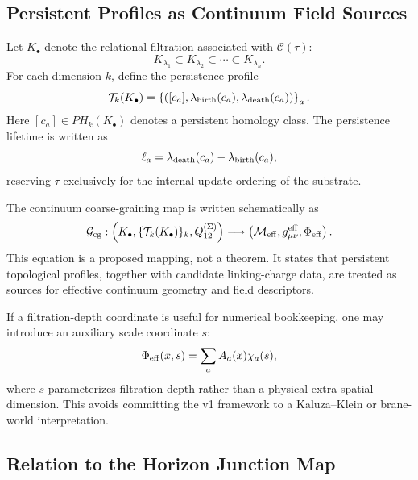 \documentclass[11pt]{article}
\newcommand{\Ccal}{\mathcal{C}}
\newcommand{\Gcg}{\mathcal{G}_{\rm cg}}
\newcommand{\Qlink}{Q_{12}^{(\Sigma)}}
\begin{document}
\subsection{Persistent Profiles as Continuum Field Sources}

Let \(K_\bullet\) denote the relational filtration associated with \(\Ccal(\tau)\):
\begin{equation}
    K_{\lambda_1}\subset K_{\lambda_2}\subset\cdots\subset K_{\lambda_n}.
\end{equation}
For each dimension \(k\), define the persistence profile
\begin{equation}
    \mathcal T_k(K_\bullet)
    =
    \left\{
    \left([c_a],\lambda_{\rm birth}(c_a),\lambda_{\rm death}(c_a)\right)
    \right\}_{a}.
\end{equation}
Here \([c_a]\in PH_k(K_\bullet)\) denotes a persistent homology class. The persistence lifetime is written as
\begin{equation}
    \ell_a=\lambda_{\rm death}(c_a)-\lambda_{\rm birth}(c_a),
\end{equation}
reserving \(\tau\) exclusively for the internal update ordering of the substrate.

The continuum coarse-graining map is written schematically as
\begin{equation}
    \Gcg:
    \left(K_\bullet,\{\mathcal T_k(K_\bullet)\}_k,\Qlink\right)
    \longrightarrow
    \left(\mathcal M_{\rm eff},g_{\mu\nu}^{\rm eff},\Phi_{\rm eff}\right).
\end{equation}
This equation is a proposed mapping, not a theorem. It states that persistent topological profiles, together with candidate linking-charge data, are treated as sources for effective continuum geometry and field descriptors.

If a filtration-depth coordinate is useful for numerical bookkeeping, one may introduce an auxiliary scale coordinate \(s\):
\begin{equation}
    \Phi_{\rm eff}(x,s)=\sum_a A_a(x)\chi_a(s),
\end{equation}
where \(s\) parameterizes filtration depth rather than a physical extra spatial dimension. This avoids committing the v1 framework to a Kaluza--Klein or brane-world interpretation.

\subsection{Relation to the Horizon Junction Map}
\end{document}
